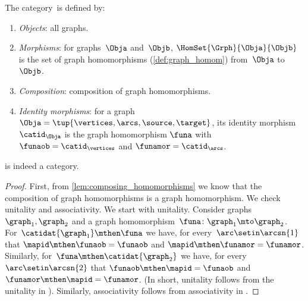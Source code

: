 \begin{ctdefinition}
    \label{def:Grph}
    The category~\Grph is defined by:
    \begin{enumerate}
        \item \emph{Objects}: all graphs.
        \item \emph{Morphisms}: for graphs~$\Obja$ and~$\Objb$, $\HomSet{\Grph}{\Obja}{\Objb}$ is the set of graph homomorphisms (\cref{def:graph_homom}) from~$\Obja$ to~$\Objb$.
        \item \emph{Composition}: composition of graph homomorphisms.
        \item \emph{Identity morphisms}: for a graph~$\Obja =\tup{\vertices,\arcs,\source,\target}$,
              its identity morphism $\catid_\Obja$ is the graph homomorphism $\funa$ with $\funaob = \catid_{\vertices}$ and $\funamor= \catid_{\arcs}$.
    \end{enumerate}
\end{ctdefinition}

\begin{lemma}\label{lem:Grph-is-cat}
    \Grph is indeed a category.
\end{lemma}

\begin{proof}
    First, from \cref{lem:composing_homomorphisms} we know that the composition of graph homomorphisms is a graph homomorphism.
    We check unitality and associativity.
    We start with unitality.
    Consider graphs~$\graph_1,\graph_2$ and a graph homomorphism~$\funa\colon \graph_1\mto \graph_2$.
    For~$\catidat{\graph_1}\mthen \funa$ we have, for every~$\arc \setin \arcsn{1}$ that $\mapid\mthen \funaob=\funaob$ and $\mapid\mthen \funamor=\funamor$.
    Similarly, for~$\funa \mthen \catidat{\graph_2}$ we have, for every $\arc \setin \arcsn{2}$ that $\funaob\mthen \mapid=\funaob$ and $\funamor \mthen \mapid=\funamor$.
    (In short, unitality follows from the unitality in \Set).
    Similarly, associativity follows from associativity in \Set.
\end{proof}
